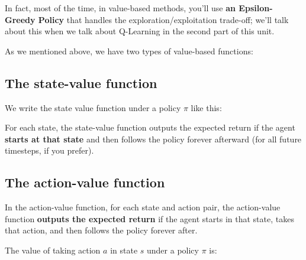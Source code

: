\documentclass[11pt,a4paper]{article}
\begin{document}
In fact, most of the time, in value-based methods, you'll use \textbf{an Epsilon-Greedy Policy} that handles the exploration/exploitation trade-off; we'll talk about this when we talk about Q-Learning in the second part of this unit.

As we mentioned above, we have two types of value-based functions:

\subsection{The state-value function}\label{the-state-value-function}

We write the state value function under a policy \(\pi\) like this:


For each state, the state-value function outputs the expected return if the agent \textbf{starts at that state} and then follows the policy forever afterward (for all future timesteps, if you prefer).


\subsection{The action-value function}\label{the-action-value-function}

In the action-value function, for each state and action pair, the action-value function \textbf{outputs the expected return} if the agent starts in that state, takes that action, and then follows the policy forever after.

The value of taking action \(a\) in state \(s\) under a policy \(\pi\) is:

\end{document}
